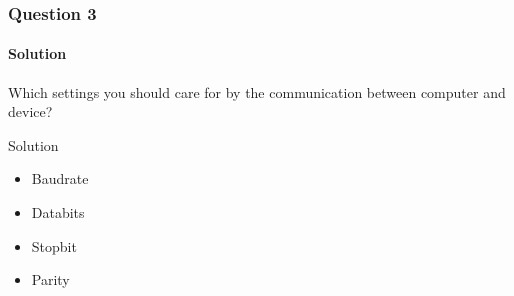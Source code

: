 \begin{frame}
    \frametitle{Question 3}
    \framesubtitle{Solution}
    \begin{large}
    	Which settings you should care for by the communication between computer and device?
    \end{large}
    \begin{block}{Solution}
    	\begin{itemize}
	    	\item Baudrate
	    	\item Databits
	    	\item Stopbit
	    	\item Parity
    	\end{itemize}
    \end{block}
\end{frame}
